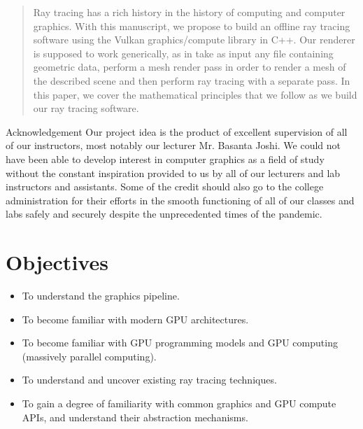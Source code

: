 \documentclass[12pt]{article}
\newcommand\PROJECTNAME{Geocold}
\begin{document}
\begin{abstract}
	Ray tracing has a rich history in the history of computing and computer 
	graphics. With this manuscript, we propose to build an offline ray tracing software using 
	the Vulkan graphics/compute library in C++. Our renderer is supposed to 
	work generically, as in take as input any file containing geometric data,
	perform a mesh render pass in order to render a mesh of the described 
	scene and then perform ray tracing with a separate pass. In this paper, we cover 
	the mathematical principles that we follow as we build our ray tracing software.
\end{abstract}

\newpage

\tableofcontents
\newpage

\begin{section}{Acknowledgement}
	Our project idea is the product of excellent supervision of all of our 
	instructors, most notably our lecturer Mr. Basanta Joshi. We could not 
	have been able to develop interest in computer graphics as a field of study 
	without the constant inspiration provided to us by all of our lecturers and 
	lab instructors and assistants. Some of the credit should also go to 
	the college administration for their efforts in the smooth functioning 
	of all of our classes and labs safely and securely despite the unprecedented 
	times of the pandemic. 
\end{section}

\newpage

\newpage
\pagestyle{fancy}
\fancyhead[C]{\PROJECTNAME}
\fancyhead[L]{}

\renewcommand{\headrulewidth}{0pt}
\renewcommand{\footrulewidth}{0pt}

\section{Objectives}
\begin{itemize}
	\item To understand the graphics pipeline.
	\item To become familiar with modern GPU architectures.
	\item To become familiar with GPU programming models and GPU computing (massively parallel computing).
	\item To understand and uncover existing ray tracing techniques.
	\item To gain a degree of familiarity with common graphics and GPU compute APIs, 
	and understand their abstraction mechanisms.
\end{itemize}
\end{document}
